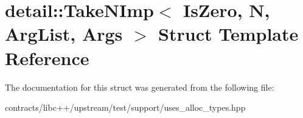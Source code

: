 \hypertarget{structdetail_1_1_take_n_imp}{}\section{detail\+:\+:Take\+N\+Imp$<$ Is\+Zero, N, Arg\+List, Args $>$ Struct Template Reference}
\label{structdetail_1_1_take_n_imp}


The documentation for this struct was generated from the following file\+:\begin{DoxyCompactItemize}
\item 
contracts/libc++/upstream/test/support/uses\+\_\+alloc\+\_\+types.\+hpp\end{DoxyCompactItemize}
